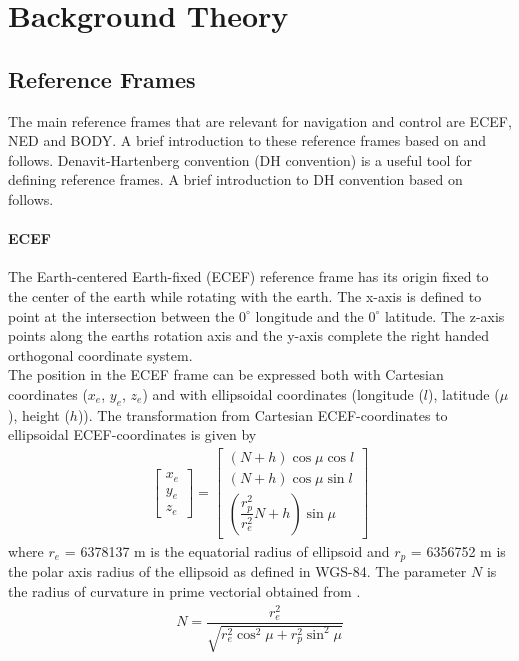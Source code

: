 \chapter{Background Theory}
\section{Reference Frames}
The main reference frames that are relevant for navigation and control are ECEF, NED and BODY. A brief introduction to these reference frames based on \citep{Fossen} and \citep{vik} follows. Denavit-Hartenberg convention (DH convention) is a useful tool for defining reference frames. A brief introduction to DH convention based on \citep{Spong} follows.
\subsubsection{ECEF}
The Earth-centered Earth-fixed (ECEF) reference frame has its origin fixed to the center of the earth while rotating with the earth. The x-axis is defined to point at the intersection between the $0^{\circ}$ longitude and the $0^{\circ}$ latitude. The z-axis points along the earths rotation axis and the y-axis complete the right handed orthogonal coordinate system.\\\newline
The position in the ECEF frame can be expressed both with Cartesian coordinates ($x_e$, $y_e$, $z_e$) and with ellipsoidal coordinates (longitude ($l$), latitude ($\mu$), height ($h$)). The transformation from Cartesian ECEF-coordinates to ellipsoidal ECEF-coordinates is given by
\begin{eqnarray}
\begin{bmatrix}
x_e\\
y_e\\
z_e
\end{bmatrix}  = \begin{bmatrix}
(N + h)\cos \mu \cos l\\
(N + h)\cos \mu \sin l\\
(\dfrac{r_p^2}{r_e^2}N + h) \sin \mu
\end{bmatrix}
\end{eqnarray}
where $r_e$ = 6378137 m is the equatorial radius of ellipsoid and $r_p$ = 6356752 m is the polar axis radius of the ellipsoid as defined in WGS-84. The parameter $N$ is the radius of curvature in prime vectorial obtained from \citep{vik}. 
\begin{eqnarray}
N = \dfrac{r_e^2}{\sqrt{r_e^2 \cos ^2 \mu + r_p^2 \sin ^2 \mu}}
\end{eqnarray}
